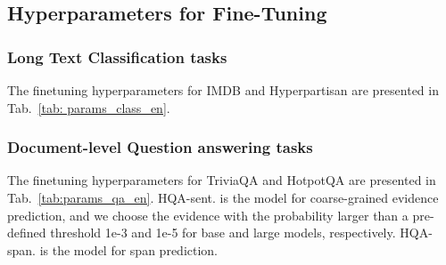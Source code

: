\documentclass[11pt,a4paper]{article}
\begin{document}
\subsection{Hyperparameters for Fine-Tuning}


\subsubsection{Long Text Classification tasks}
The finetuning hyperparameters for IMDB \citep{maas2011learning} and Hyperpartisan \citep{kiesel2019semeval} are presented in Tab.~\ref{tab: params_class_en}.

\begin{table}[!h]
\centering
{}
\caption{Hyperparameters used for finetuning on IMDB and Hyperpartisan (HYP).}
\label{tab: params_class_en}
\vspace{-0.5cm}
\end{table}

\subsubsection{Document-level Question answering tasks}
The finetuning hyperparameters for TriviaQA \citep{welbl2018constructing} and HotpotQA \citep{yang2018hotpotqa} are presented in Tab.~\ref{tab:params_qa_en}. HQA-sent. is the model for coarse-grained evidence prediction, and we choose the evidence with the probability larger than a pre-defined threshold 1e-3 and 1e-5 for base and large models, respectively. HQA-span. is the model for span prediction.
\end{document}
